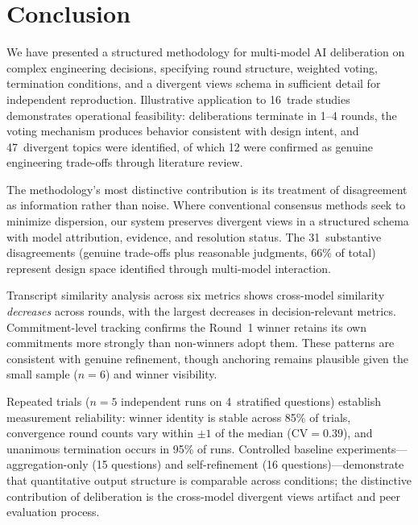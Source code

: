 \documentclass[11pt,a4paper]{article}
\begin{document}
\section{Conclusion}
\label{sec:conclusion}

We have presented a structured methodology for multi-model AI deliberation on complex engineering decisions, specifying round structure, weighted voting, termination conditions, and a divergent views schema in sufficient detail for independent reproduction. Illustrative application to 16~trade studies demonstrates operational feasibility: deliberations terminate in 1--4 rounds, the voting mechanism produces behavior consistent with design intent, and 47~divergent topics were identified, of which 12 were confirmed as genuine engineering trade-offs through literature review.

The methodology's most distinctive contribution is its treatment of disagreement as information rather than noise. Where conventional consensus methods seek to minimize dispersion, our system preserves divergent views in a structured schema with model attribution, evidence, and resolution status. The 31~substantive disagreements (genuine trade-offs plus reasonable judgments, 66\% of total) represent design space identified through multi-model interaction.

Transcript similarity analysis across six metrics shows cross-model similarity \emph{decreases} across rounds, with the largest decreases in decision-relevant metrics. Commitment-level tracking confirms the Round~1 winner retains its own commitments more strongly than non-winners adopt them. These patterns are consistent with genuine refinement, though anchoring remains plausible given the small sample ($n = 6$) and winner visibility.

Repeated trials ($n = 5$ independent runs on 4~stratified questions) establish measurement reliability: winner identity is stable across 85\% of trials, convergence round counts vary within $\pm 1$ of the median ($\text{CV} = 0.39$), and unanimous termination occurs in 95\% of runs. Controlled baseline experiments---aggregation-only (15 questions) and self-refinement (16 questions)---demonstrate that quantitative output structure is comparable across conditions; the distinctive contribution of deliberation is the cross-model divergent views artifact and peer evaluation process.
\end{document}
